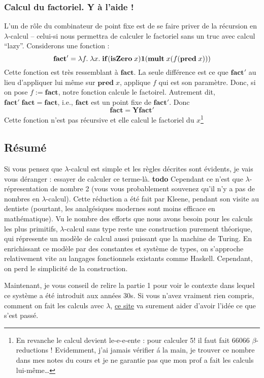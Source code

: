 \subsubsection*{Calcul du factoriel. Y à l'aide !}
L'un de rôle du combinateur de point fixe est de se faire priver de la récursion en $\lambda$-calcul -- celui-si nous permettra de calculer le factoriel sans un truc avec calcul ``lazy''.
Considerons une fonction :
$$\mathbf{fact'} = \lambda f. \; \lambda x. \; \mathbf{if} (\mathbf{isZero} \; x) \mathbf{1} (\mathbf{mult} \; x (f (\mathbf{pred} \; x)))$$
Cette fonction est très ressemblant à $\mathbf{fact}$. La seule différence est ce que $\mathbf{fact'}$ au lieu d'appliquer lui même sur $\mathbf{pred} \; x$, applique $f$ qui est son paramètre.
Donc, si on pose $f := \mathbf{fact}$, notre fonction calcule le factoirel.
Autrement dit, $\mathbf{fact'} \; \mathbf{fact} = \mathbf{fact}$, i.e., $\mathbf{fact}$ est un point fixe de $\mathbf{fact'}$.
Donc $$\mathbf{fact} = \mathbf{Y} \mathbf{fact'}$$
Cette fonction n'est pas récursive et elle calcul le factoriel du $x$\footnote{
	En revanche le calcul devient le-e-e-ente : pour calculer 5! il faut fait 66066 $\beta$-reductions ! Evidemment, j'ai jamais vérifier á la main, je trouver ce nombre dans mes notes du cours et je ne garantie pas que mon prof a fait les calculs lui-même\ldots
}

\subsection*{Résumé}
Si vous pensez que $\lambda$-calcul est simple et les règles décrites sont évidents, je vais vous déranger : essayer de calculer ce terme-là.
\textbf{todo}
Cependant ce n'est que $\lambda$-répresentation de nombre 2 (vous vous probablement souvenez qu'il n'y a pas de nombres en $\lambda$-calcul).
Cette réduction a été fait par Kleene, pendant son visite au dentiste (pourtant, les analgésiques modernes sont moins efficace en mathématique).
Vu le nombre des efforts que nous avons besoin pour les calculs les plus primitifs, $\lambda$-calcul sans type reste une construction purement théorique, qui répresente un modèle de calcul aussi puissant que la machine de Turing.
En enrichissant ce modèle par des constantes et système de types, on s'approche relativement vite au langages fonctionnels existants comme Haskell.
Cependant, on perd le simplicité de la construction.

Maintenant, je vous conseil de relire la partie 1 pour voir le contexte dans lequel ce système a été introduit aux années 30s.
Si vous n'avez vraiment rien compris, comment on fait les calculs avec $\lambda$, \href{http://worrydream.com/AlligatorEggs/}{ce site} va surement aider d'avoir l'idée ce que s'est passé.